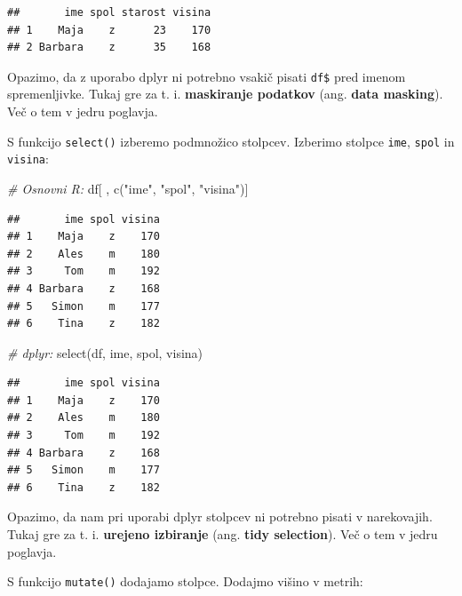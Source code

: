 \documentclass[
]{book}
\newenvironment{Shaded}{\begin{snugshade}}{\end{snugshade}}
\newcommand{\CommentTok}[1]{\textcolor[rgb]{0.56,0.35,0.01}{\textit{#1}}}
\newcommand{\DecValTok}[1]{\textcolor[rgb]{0.00,0.00,0.81}{#1}}
\newcommand{\FunctionTok}[1]{\textcolor[rgb]{0.00,0.00,0.00}{#1}}
\newcommand{\NormalTok}[1]{#1}
\newcommand{\OtherTok}[1]{\textcolor[rgb]{0.56,0.35,0.01}{#1}}
\newcommand{\SpecialCharTok}[1]{\textcolor[rgb]{0.00,0.00,0.00}{#1}}
\newcommand{\StringTok}[1]{\textcolor[rgb]{0.31,0.60,0.02}{#1}}
\begin{document}
\begin{verbatim}
##       ime spol starost visina
## 1    Maja    z      23    170
## 2 Barbara    z      35    168
\end{verbatim}

Opazimo, da z uporabo dplyr ni potrebno vsakič pisati \texttt{df\$} pred imenom spremenljivke. Tukaj gre za t. i. \textbf{maskiranje podatkov} (ang. \textbf{data masking}). Več o tem v jedru poglavja.

S funkcijo \texttt{select()} izberemo podmnožico stolpcev. Izberimo stolpce \texttt{ime}, \texttt{spol} in \texttt{visina}:

\begin{Shaded}
\begin{Highlighting}[]
\CommentTok{\# Osnovni R:}
\NormalTok{df[ , }\FunctionTok{c}\NormalTok{(}\StringTok{"ime"}\NormalTok{, }\StringTok{"spol"}\NormalTok{, }\StringTok{"visina"}\NormalTok{)]}
\end{Highlighting}
\end{Shaded}

\begin{verbatim}
##       ime spol visina
## 1    Maja    z    170
## 2    Ales    m    180
## 3     Tom    m    192
## 4 Barbara    z    168
## 5   Simon    m    177
## 6    Tina    z    182
\end{verbatim}

\begin{Shaded}
\begin{Highlighting}[]
\CommentTok{\# dplyr:}
\FunctionTok{select}\NormalTok{(df, ime, spol, visina)}
\end{Highlighting}
\end{Shaded}

\begin{verbatim}
##       ime spol visina
## 1    Maja    z    170
## 2    Ales    m    180
## 3     Tom    m    192
## 4 Barbara    z    168
## 5   Simon    m    177
## 6    Tina    z    182
\end{verbatim}

Opazimo, da nam pri uporabi dplyr stolpcev ni potrebno pisati v narekovajih. Tukaj gre za t. i. \textbf{urejeno izbiranje} (ang. \textbf{tidy selection}). Več o tem v jedru poglavja.

S funkcijo \texttt{mutate()} dodajamo stolpce. Dodajmo višino v metrih:

\begin{Shaded}
\end{Shaded}
\end{document}

